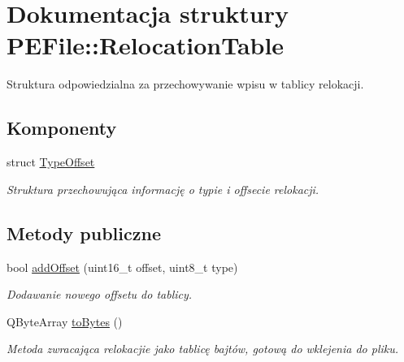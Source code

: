 \hypertarget{struct_p_e_file_1_1_relocation_table}{\section{Dokumentacja struktury P\-E\-File\-:\-:Relocation\-Table}
\label{struct_p_e_file_1_1_relocation_table}
}


Struktura odpowiedzialna za przechowywanie wpisu w tablicy relokacji.  


\subsection*{Komponenty}
\begin{DoxyCompactItemize}
\item 
struct \hyperlink{struct_p_e_file_1_1_relocation_table_1_1_type_offset}{Type\-Offset}
\begin{DoxyCompactList}\small\item\em Struktura przechowująca informację o typie i offsecie relokacji. \end{DoxyCompactList}\end{DoxyCompactItemize}
\subsection*{Metody publiczne}
\begin{DoxyCompactItemize}
\item 
bool \hyperlink{struct_p_e_file_1_1_relocation_table_afd8b0b16ce56bd171f26c5e202ab3bd6}{add\-Offset} (uint16\-\_\-t offset, uint8\-\_\-t type)
\begin{DoxyCompactList}\small\item\em Dodawanie nowego offsetu do tablicy. \end{DoxyCompactList}\item 
Q\-Byte\-Array \hyperlink{struct_p_e_file_1_1_relocation_table_ab4ffcdaf0bb39d4042dcab51436300fa}{to\-Bytes} ()
\begin{DoxyCompactList}\small\item\em Metoda zwracająca relokacjie jako tablicę bajtów, gotową do wklejenia do pliku. \end{DoxyCompactList}\end{DoxyCompactItemize}
